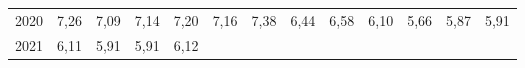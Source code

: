 \begin{tabular}{lllllllllllll}
\multicolumn{1}{l}{\hspace{1em}2020} &
  \multicolumn{1}{|r}{7,26} &
  \multicolumn{1}{r}{7,09} &
  \multicolumn{1}{r}{7,14} &
  \multicolumn{1}{r}{7,20} &
  \multicolumn{1}{r}{7,16} &
  \multicolumn{1}{r}{7,38} &
  \multicolumn{1}{r}{6,44} &
  \multicolumn{1}{r}{6,58} &
  \multicolumn{1}{r}{6,10} &
  \multicolumn{1}{r}{5,66} &
  \multicolumn{1}{r}{5,87} &
  \multicolumn{1}{r}{5,91} \\
\multicolumn{1}{l}{\hspace{1em}2021} &
  \multicolumn{1}{|r}{6,11} &
  \multicolumn{1}{r}{5,91} &
  \multicolumn{1}{r}{5,91} &
  \multicolumn{1}{r}{6,12} &
  \multicolumn{1}{r}{} &
  \multicolumn{1}{r}{} &
  \multicolumn{1}{r}{} &
  \multicolumn{1}{r}{} &
  \multicolumn{1}{r}{} &
  \multicolumn{1}{r}{} &
  \multicolumn{1}{r}{} &
  \multicolumn{1}{r}{} \\
\cline{1-13}
\end{tabular}
